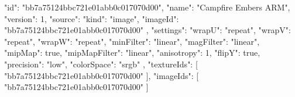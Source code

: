 {
  "id": "bb7a75124bbc721e01abb0c017070d00",
  "name": "Campfire Embers ARM",
  "version": 1,
  "source": {
    "kind": "image",
    "imageId": "bb7a75124bbc721e01abb0c017070d00"
  },
  "settings": {
    "wrapU": "repeat",
    "wrapV": "repeat",
    "wrapW": "repeat",
    "minFilter": "linear",
    "magFilter": "linear",
    "mipMap": true,
    "mipMapFilter": "linear",
    "anisotropy": 1,
    "flipY": true,
    "precision": "low",
    "colorSpace": "srgb"
  },
  "textureIds": [
    "bb7a75124bbc721e01abb0c017070d00"
  ],
  "imageIds": [
    "bb7a75124bbc721e01abb0c017070d00"
  ]
}

